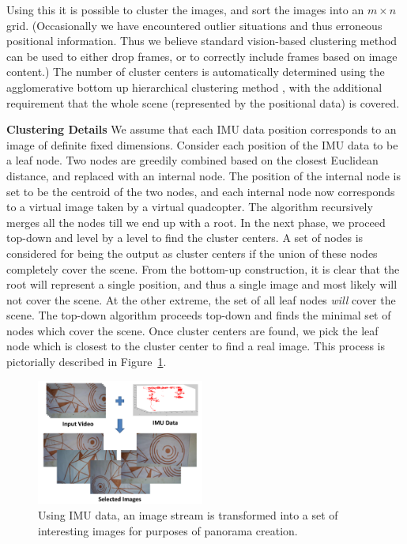 \documentclass[10pt,twocolumn,letterpaper]{article}
\begin{document}
Using this it is possible to cluster the images, and sort the images
into an $m\times n$ grid.  (Occasionally we have encountered outlier
situations and thus erroneous positional information.  Thus we believe
standard vision-based clustering method can be used to either drop
frames, or to correctly include frames based on image content.)  The
number of cluster centers is automatically determined using the
agglomerative bottom up hierarchical clustering method \cite{Lior}, with the
additional requirement that the whole scene (represented by the
positional data) is covered.  

{\bf Clustering Details} We assume that each IMU data position
corresponds to an image of definite fixed dimensions.  Consider each
position of the IMU data to be a leaf node. Two nodes are greedily
combined based on the closest Euclidean distance, and replaced with an
internal node.  The position of the internal node is set to be the
centroid of the two nodes, and each internal node now corresponds to a
virtual image taken by a virtual quadcopter.  The algorithm
recursively merges all the nodes till we end up with a root.  In the
next phase, we proceed top-down and level by a level to find the
cluster centers.  A set of nodes is considered for being the output as
cluster centers if the union of these nodes completely cover the
scene. From the bottom-up construction, it is clear that the root will
represent a single position, and thus a single image and most likely
will not cover the scene.  At the other extreme, the set of all leaf
nodes \emph{will} cover the scene.  The top-down algorithm proceeds
top-down and finds the minimal set of nodes which cover the scene.
Once cluster centers are found, we pick the leaf node which is closest
to the cluster center to find a real image.
This process is pictorially described in
Figure~\ref{fig:selection}.


\begin{figure}[h!]
  \centering
  \includegraphics[width=0.49\textwidth]{figures/selection} 
  \caption{ \label{fig:selection} Using IMU data, an image stream is
    transformed into a set of interesting images for purposes of
    panorama creation. }
\end{figure}    
\end{document}
